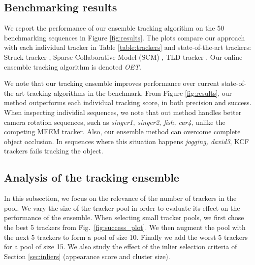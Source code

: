 \subsection{Benchmarking results}

We report the performance of our ensemble tracking algorithm on the 50
benchmarking sequences in
Figure \ref{fig:results}.
The plots compare our approach with each individual tracker
in Table \ref{table:trackers} and state-of-the-art trackers: Struck tracker
\cite{Hare2011}, Sparse Collaborative Model (SCM) \cite{Zhong2012}, TLD tracker
\cite{Kalal2011}. Our online ensemble tracking algorithm is denoted \textit{OET}.

We note that our tracking ensemble improves performance over current
state-of-the-art tracking algorithms in the benchmark.
From Figure \ref{fig:results}, our method outperforms each individual tracking
score, in both precision and success.
When inspecting individial sequences, we note that 
out method handles better camera
rotation sequences, such as \textit{singer1, singer2, fish, car4}, unlike
the competing
MEEM tracker. Also, our ensemble method can overcome complete object occlusion. In
sequences where this situation happens \textit{jogging, david3}, KCF trackers
fails tracking the object. 


\subsection{Analysis of the tracking ensemble}
In this subsection, we focus on the relevance of the number of trackers in the pool.
We vary the size of the tracker pool in order to evaluate its effect on the
performance of the ensemble.
When selecting small tracker pools, we first chose the best 5 trackers
from Fig.~\ref{fig:success_plot}. We then augment the pool with the next 5 trackers to
form a pool of size 10. Finally we add the worst 5 trackers for a pool of size 15.
We also study the effect of the inlier selection criteria of Section
\ref{sec:inliers}
(appearance score and cluster size).


